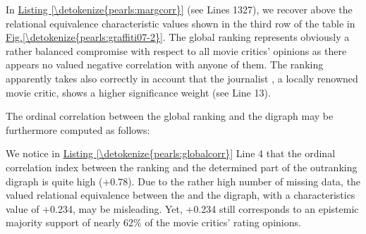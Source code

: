 \documentclass[a4paper,12pt,english]{sphinxhowto}
\begin{document}
\sphinxAtStartPar
In \hyperref[\detokenize{pearls:margcorr}]{Listing \ref{\detokenize{pearls:margcorr}}} (see Lines 13\sphinxhyphen{}27), we recover above the relational equivalence characteristic values shown in the third row of the table in \hyperref[\detokenize{pearls:graffiti07-2}]{Fig.\@ \ref{\detokenize{pearls:graffiti07-2}}}. The global  ranking represents obviously a rather balanced compromise with respect to all movie critics’ opinions as there appears no valued negative correlation with anyone of them. The  ranking apparently takes also correctly in account that the journalist , a locally renowned movie critic, shows a higher significance weight (see Line 13).

\sphinxAtStartPar
The ordinal correlation between the global  ranking and the digraph  may be furthermore computed as follows:
\def\sphinxLiteralBlockLabel{\label{\detokenize{pearls:globalcorr}}}
%
\begin{sphinxVerbatim}[commandchars=\\\{\},numbers=left,firstnumber=1,stepnumber=1]
  
\end{sphinxVerbatim}
\sphinxresetverbatimhllines

\sphinxAtStartPar
We notice in \hyperref[\detokenize{pearls:globalcorr}]{Listing \ref{\detokenize{pearls:globalcorr}}} Line 4 that the ordinal correlation  index between the  ranking  and the determined part of the outranking digraph  is quite high (+0.78). Due to the rather high number of missing data, the  \sphinxhyphen{}valued relational equivalence between the  and the  digraph, with a characteristics value of  +0.234, may be misleading. Yet, +0.234 still corresponds to an epistemic majority support of nearly 62\% of the movie critics’ rating opinions.
\end{document}
